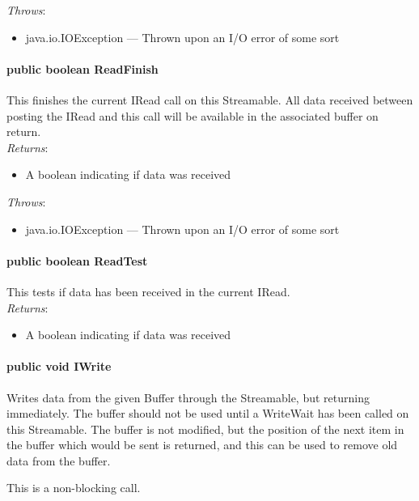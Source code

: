 \documentclass[$Date: 2003/06/26 19:29:31 $]{glabarticle}
\begin{document}
 \textit{Throws}:
 \begin{itemize}
 \item[] java.io.IOException --- Thrown upon an I/O error of some sort 
 \end{itemize}

\paragraph{public boolean ReadFinish}

This finishes the current IRead call on this Streamable.  All data
received between posting the IRead and this call will be available
in the associated buffer on return. \\

\textit{Returns}:
\begin{itemize}
\item[] A boolean indicating if data was received
\end{itemize}

 \textit{Throws}:
 \begin{itemize}
 \item[] java.io.IOException --- Thrown upon an I/O error of some sort 
 \end{itemize}

\paragraph{public boolean ReadTest}

This tests if data has been received in the current IRead.\\

\textit{Returns}:
\begin{itemize}
\item[] A boolean indicating if data was received
\end{itemize}

\paragraph{public void IWrite}

Writes data from the given Buffer through the Streamable, but returning
immediately.  The buffer should not be used until a WriteWait has been
called on this Streamable.  The buffer is not modified, but the position of
the next item in the buffer which would be sent is returned, and this
can be used to remove old data from the buffer.
 
This is a non-blocking call.\\
\end{document}
